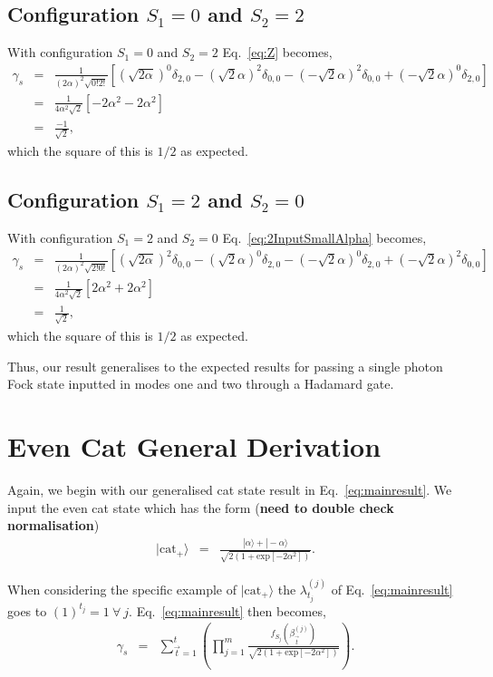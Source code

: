 \documentclass[aps,pra,singlecolumn,amsmath,amssymb,nofootinbib,superscriptaddress]{revtex4}
\newcommand{\ket}[1]{|#1\rangle}
\begin{document}
\subsection{Configuration $S_1=0$ and $S_2=2$}
With configuration $S_1=0$ and $S_2=2$ Eq.~\ref{eq:Z} becomes,
\begin{eqnarray} \label{}
\gamma_s &=&  \frac{1}{(2\alpha)^2\sqrt{0!2!}} \left[
(\sqrt{2\alpha})^{0}\delta_{2,0}
-(\sqrt{2}\alpha)^{2}\delta_{0,0}
-(-\sqrt{2}\alpha)^{2}\delta_{0,0}
+(-\sqrt{2}\alpha)^{0}\delta_{2,0}
\right] \nonumber \\
&=& \frac{1}{4\alpha^2\sqrt{2}} \left[
-2\alpha^{2}
-2\alpha^{2} 
\right] \nonumber \\
&=& \frac{-1}{\sqrt{2}},
\end{eqnarray}
which the square of this is $1/2$ as expected.

\subsection{Configuration $S_1=2$ and $S_2=0$}
With configuration $S_1=2$ and $S_2=0$ Eq.~\ref{eq:2InputSmallAlpha} becomes,
\begin{eqnarray} \label{}
\gamma_s &=&  \frac{1}{(2\alpha)^2\sqrt{2!0!}} \left[
(\sqrt{2\alpha})^{2}\delta_{0,0}
-(\sqrt{2}\alpha)^{0}\delta_{2,0}
-(-\sqrt{2}\alpha)^{0}\delta_{2,0}
+(-\sqrt{2}\alpha)^{2}\delta_{0,0}
\right] \nonumber \\
&=& \frac{1}{4\alpha^2\sqrt{2}} \left[
2\alpha^{2}
+2\alpha^{2}
\right] \nonumber \\
&=& \frac{1}{\sqrt{2}},
\end{eqnarray}
which the square of this is $1/2$ as expected.

Thus, our result generalises to the expected results for passing a single photon Fock state inputted in modes one and two through a Hadamard gate.
\section{Even Cat General Derivation}
Again, we begin with our generalised cat state result in Eq.~\ref{eq:mainresult}. We input the even cat state which has the form (\textbf{need to double check normalisation})
\begin{eqnarray}
\ket{\mathrm{cat}_+} &=& \frac{\ket{\alpha}+\ket{-\alpha}}{\sqrt{2(1+\mathrm{exp}[-2\alpha^2])}}.
\end{eqnarray}

When considering the specific example of $\ket{\mathrm{cat}_+}$ the $\lambda_{t_j}^{(j)}$ of Eq.~\ref{eq:mainresult} goes to $(1)^{t_j}=1\ \forall\ j$. Eq.~\ref{eq:mainresult} then becomes,
\begin{eqnarray} \label{}
\gamma_s &=& \sum_{\vec{t}=1}^{t} \left(\prod_{j=1}^m \frac{f_{S_j}(\beta_{\vec{t}}^{(j)})}{\sqrt{2(1+\mathrm{exp}[-2\alpha^2])}} \right).
\end{eqnarray}
\end{document}
